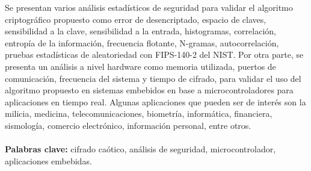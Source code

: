 Se presentan varios análisis estadísticos de seguridad para validar el algoritmo criptográfico propuesto como error de desencriptado, espacio de claves, sensibilidad a la clave, sensibilidad a la entrada, histogramas, correlación, entropía de la información, frecuencia flotante, N-gramas, autocorrelación, pruebas estadísticas de aleatoriedad con FIPS-140-2 del NIST. Por otra parte, se presenta un análisis a nivel hardware como memoria utilizada, puertos de comunicación, frecuencia del sistema y tiempo de cifrado, para validar el uso del algoritmo propuesto en sistemas embebidos en base a microcontroladores para aplicaciones en tiempo real. Algunas aplicaciones que pueden ser de interés son la milicia, medicina, telecomunicaciones, biometría, informática, financiera, sismología, comercio electrónico, información personal, entre otros.\\     
\\

\textbf{Palabras clave:} cifrado caótico, análisis de seguridad, microcontrolador, aplicaciones embebidas.  



